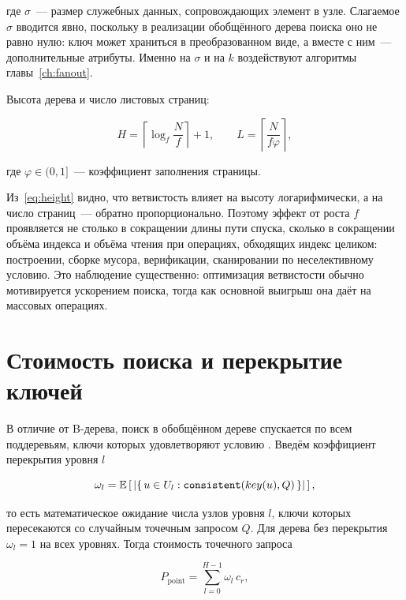 где $\sigma$~--- размер служебных данных, сопровождающих элемент в узле.
Слагаемое $\sigma$ вводится явно, поскольку в реализации обобщённого дерева
поиска оно не равно нулю: ключ может храниться в преобразованном виде, а вместе
с ним~--- дополнительные атрибуты. Именно на $\sigma$ и на $k$ воздействуют
алгоритмы главы~\ref{ch:fanout}.

Высота дерева и число листовых страниц:

\begin{equation}
\label{eq:height}
H = \left\lceil \log_f \frac{N}{f} \right\rceil + 1,
\qquad
L = \left\lceil \frac{N}{f\varphi} \right\rceil ,
\end{equation}

где $\varphi \in (0,1]$~--- коэффициент заполнения страницы.

Из~\eqref{eq:height} видно, что ветвистость влияет на высоту логарифмически, а
на число страниц~--- обратно пропорционально. Поэтому эффект от роста $f$
проявляется не столько в сокращении длины пути спуска, сколько в сокращении
объёма индекса и объёма чтения при операциях, обходящих индекс целиком:
построении, сборке мусора, верификации, сканировании по неселективному условию.
Это наблюдение существенно: оптимизация ветвистости обычно мотивируется
ускорением поиска, тогда как основной выигрыш она даёт на массовых операциях.

\section{Стоимость поиска и перекрытие ключей}

В отличие от B-дерева, поиск в обобщённом дереве спускается по всем поддеревьям,
ключи которых удовлетворяют условию . Введём коэффициент
перекрытия уровня $l$

\begin{equation}
\label{eq:overlap}
\omega_l = \mathbb{E}\left[\,\left|\{\,u \in U_l : \texttt{consistent}(key(u), Q)\,\}\right|\,\right],
\end{equation}

то есть математическое ожидание числа узлов уровня $l$, ключи которых
пересекаются со случайным точечным запросом $Q$. Для дерева без перекрытия
$\omega_l = 1$ на всех уровнях. Тогда стоимость точечного запроса

\begin{equation}
\label{eq:point}
P_{\text{point}} = \sum_{l=0}^{H-1} \omega_l \, c_r ,
\end{equation}

